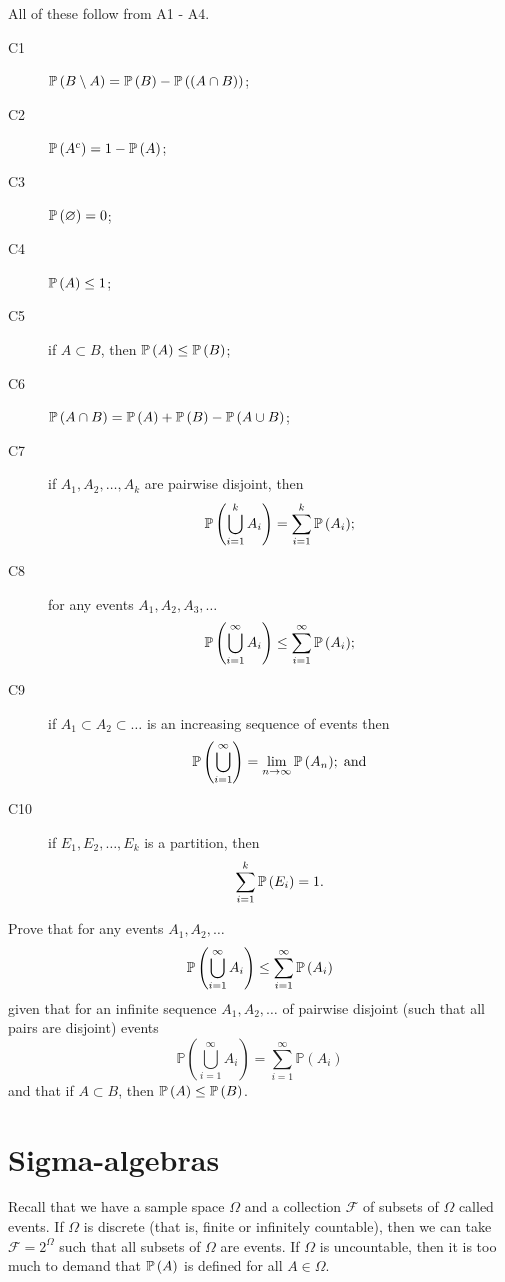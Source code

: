 \begin{proposition}
    All of these follow from A1 - A4.
    \begin{description}
        \item[C1] $\operatorname{\mathbb{P}}{(B \setminus A)} = \operatorname{\mathbb{P}}{(B)} - \operatorname{\mathbb{P}}{((A \cap B))}$;
        \item[C2] $\operatorname{\mathbb{P}}{(A^c)} = 1 - \operatorname{\mathbb{P}}{(A)}$;
        \item[C3] $\operatorname{\mathbb{P}}{(\varnothing)} = 0$;
        \item[C4] $\operatorname{\mathbb{P}}{(A)} \leq 1$;
        \item[C5] if $A \subset B$, then $\operatorname{\mathbb{P}}{(A)} \leq \operatorname{\mathbb{P}}{(B)}$;
        \item[C6] $\operatorname{\mathbb{P}}{(A \cap B)} = \operatorname{\mathbb{P}}{(A)} + \operatorname{\mathbb{P}}{(B)} - \operatorname{\mathbb{P}}{(A \cup B)}$;
        \item[C7] if $A_1, A_2, \ldots, A_k$ are pairwise disjoint, then \[ \operatorname{\mathbb{P}}{ \left( \bigcup_{i = 1}^k A_i \right)} = \sum_{i = 1}^k \operatorname{\mathbb{P}}{(A_i)}; \]
        \item[C8] for any events $A_1, A_2, A_3, \ldots$ \[ \operatorname{\mathbb{P}}{ \left( \bigcup_{i = 1}^\infty A_i \right) } \leq \sum_{i = 1}^\infty \operatorname{\mathbb{P}}{(A_i)}; \]
        \item[C9] if $A_1 \subset A_2 \subset \ldots$ is an increasing sequence of events then \[ \operatorname{\mathbb{P}}{ \left( \bigcup_{i = 1}^\infty \right) } = \lim_{n \to \infty} \operatorname{\mathbb{P}}{(A_n)}; \; \text{and} \] 
        \item[C10] if $E_1, E_2, \ldots, E_k$ is a partition, then \[ \sum_{i = 1}^k \operatorname{\mathbb{P}}{(E_i)} = 1. \]  
    \end{description}
\end{proposition}

\begin{example}
    Prove that for any events $A_1, A_2, \ldots$ \[ \operatorname{\mathbb{P}}{ \left( \bigcup_{i = 1}^\infty A_i \right) } \leq \sum_{i = 1}^\infty \operatorname{\mathbb{P}}{(A_i)} \] given that for an infinite sequence $A_1, A_2, \ldots$ of pairwise disjoint (such that all pairs are disjoint) events \[ \mathbb{P} \left( \bigcup\limits_{i=1}^\infty A_i \right) = \sum_{i=1}^\infty \mathbb{P}(A_i) \] and that if $A \subset B$, then $\operatorname{\mathbb{P}}{(A)} \leq \operatorname{\mathbb{P}}{(B)}$.
\end{example}

\section{Sigma-algebras}

Recall that we have a sample space $\Omega$ and a collection $\mathcal F$ of subsets of $\Omega$ called events. If $\Omega$ is discrete (that is, finite or infinitely countable), then we can take $\mathcal F = 2^\Omega$ such that all subsets of $\Omega$ are events. If $\Omega$ is uncountable, then it is too much to demand that $\operatorname{\mathbb{P}}{(A)}$ is defined for all $A \in \Omega$.

